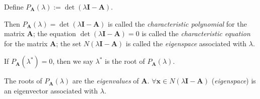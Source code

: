 \begin{definition}
Define $P_{\bm A}(\lambda):=\det(\lambda\bm I-\bm A)$. 

Then $P_{\bm A}(\lambda)=\det(\lambda\bm I-\bm A)$ is called the \emph{characteristic polynomial} for the matrix $\bm A$; the equation $\det(\lambda\bm I-\bm A)=0$ is called the \emph{characteristic equation} for the matrix $\bm A$; the set $N(\lambda\bm I-\bm A)$ is called the \emph{eigenspace} associated with $\lambda$.

If $P_{\bm A}(\lambda^{*})=0$, then we say $\lambda^*$ is the root of $P_{\bm A}(\lambda)$.
\end{definition}

The roots of $P_{\bm A}(\lambda)$ are the \emph{eigenvalues} of $\bm A$. $\forall\bm x\in N(\lambda\bm I-\bm A)$ (\textit{eigenspace}) is an eigenvector associated with $\lambda$.

